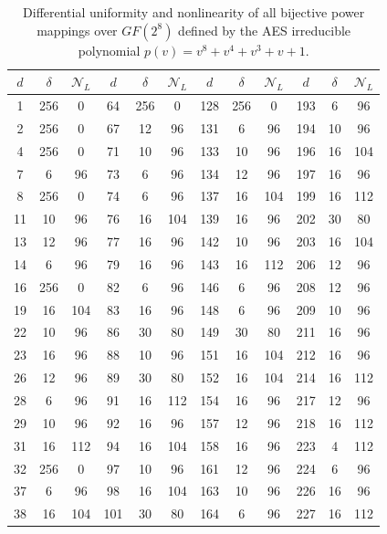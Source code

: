 \begin{table}[ht!]
\begin{center}
\caption{Differential uniformity and nonlinearity of all bijective power mappings over $GF(2^8)$ defined by the AES irreducible polynomial $p(v) = v^8 + v^4 + v^3 + v + 1$.}
\label{tab:gf28maps}
    \begin{tabular}{|c|c|c||c|c|c||c|c|c||c|c|c|} \hline
    $d$ & $\delta$ & $\mathcal{N}_L$ & $d$ & $\delta$ & $\mathcal{N}_L$ & $d$ & $\delta$ & $\mathcal{N}_L$ & $d$ & $\delta$ & $\mathcal{N}_L$ \\ \hline
    1 & 256 & 0 & 64 & 256 & 0 & 128 & 256 & 0 & 193 & 6 & 96 \\  
    2 & 256 & 0 & 67 & 12 & 96 & 131 & 6 & 96 & 194 & 10 & 96 \\ 
    4 & 256 & 0 & 71 & 10 & 96 & 133 & 10 & 96 & 196 & 16 & 104 \\
    7 & 6 & 96 & 73 & 6 & 96 & 134 & 12 & 96 & 197 & 16 & 96 \\
    8 & 256 & 0 & 74 & 6 & 96 & 137 & 16 & 104 & 199 & 16 & 112 \\  
    11 & 10 & 96 & 76 & 16 & 104 & 139 & 16 & 96 & 202 & 30 & 80 \\ 
    13 & 12 & 96 & 77 & 16 & 96 & 142 & 10 & 96 & 203 & 16 & 104 \\  
    14 & 6 & 96 & 79 & 16 & 96 & 143 & 16 & 112 & 206 & 12 & 96 \\
    16 & 256 & 0 & 82 & 6 & 96 & 146 & 6 & 96 & 208 & 12 & 96 \\ 
    19 & 16 & 104 & 83 & 16 & 96 & 148 & 6 & 96 & 209 & 10 & 96 \\ 
    22 & 10 & 96 & 86 & 30 & 80 & 149 & 30 & 80 & 211 & 16 & 96 \\ 
    23 & 16 & 96 & 88 & 10 & 96 & 151 & 16 & 104 & 212 & 16 & 96 \\ 
    26 & 12 & 96 & 89 & 30 & 80 & 152 & 16 & 104 & 214 & 16 & 112 \\ 
    28 & 6 & 96 & 91 & 16 & 112 & 154 & 16 & 96 & 217 & 12 & 96 \\ 
    29 & 10 & 96 & 92 & 16 & 96 & 157 & 12 & 96 & 218 & 16 & 112 \\ 
    31 & 16 & 112 & 94 & 16 & 104 & 158 & 16 & 96 & {\color{red} 223} & {\color{red} 4} & {\color{red} 112} \\ 
    32 & 256 & 0 & 97 & 10 & 96 & 161 & 12 & 96 & 224 & 6 & 96 \\
    37 & 6 & 96 & 98 & 16 & 104 & 163 & 10 & 96 & 226 & 16 & 96 \\ 
    38 & 16 & 104 & 101 & 30 & 80 & 164 & 6 & 96 & 227 & 16 & 112 \\ 

\end{tabular}
\end{center}
\end{table}
